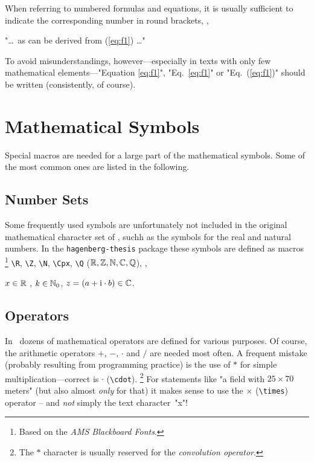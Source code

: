 When referring to numbered formulas and equations, it is usually sufficient
to indicate the corresponding number in round brackets, \eg,
%
\begin{center}
	"\ldots\ as can be derived from (\ref{eq:f1}) \ldots"
\end{center}
%
To avoid misunderstandings, however---especially in texts with only few
mathematical elements---"Equation \ref{eq:f1}", "Eq.~\ref{eq:f1}" or 
"Eq.~(\ref{eq:f1})" should be written (consistently, of course).
%
\begin{center}
	\setlength{\fboxrule}{0.2mm}
	\setlength{\fboxsep}{2mm}
\end{center}


\section{Mathematical Symbols}

Special macros are needed for a large part of the mathematical symbols. Some of
the most common ones are listed  in the following.


\subsection{Number Sets}

Some frequently used symbols are unfortunately not included in the original 
mathematical character set of \latex, suchh as the symbols for the real and natural 
numbers. In the \texttt{hagenberg-thesis} package these symbols are defined
as macros%
\footnote{Based on the \emph{AMS Blackboard Fonts}.}
\verb!\R!, \verb!\Z!, \verb!\N!, \verb!\Cpx!, \verb!\Q! ($\R, \Z, \N, \Cpx, \Q$),
\eg,
%
\begin{center}
	$x \in \R$ , $k \in \N_0$, $z = (a + \mathrm{i} \cdot b) \in \Cpx$.
\end{center}


\subsection{Operators}

In \latex\ dozens of mathematical operators are defined for various purposes.
Of course, the arithmetic operators $+$, $-$, $\cdot$ and $/$ are needed most often.
A frequent mistake (probably resulting from programming practice) is the use
of $*$ for simple multiplication---correct is $\cdot$ (\verb!\cdot!).%
\footnote{The $*$ character is usually reserved for the \emph{convolution operator}.}
%
For statements like "a field with $25 \times 70$ meters" (but also almost
\emph{only} for that) it makes sense to use the $\times$ (\verb!\times!) operator
-- and \emph{not} simply the text character~"x"!


